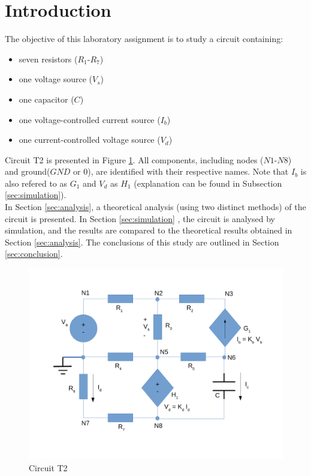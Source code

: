 
\section{Introduction}
\label{sec:introduction}


The objective of this laboratory assignment is to study a circuit containing:
\begin{itemize}
	\item seven resistors ($R_1$-$R_7$)
	\item one voltage source ($V_s$) %
	\item one capacitor ($C$)
	\item one voltage-controlled current source ($I_b$)
	\item one current-controlled voltage source ($V_d$)
\end{itemize}


Circuit T2 is presented in Figure \ref{fig:Desenho_t2}. All components, including nodes
($N1$-$N8$) and ground($GND$ or $0$), are identified with their respective names. Note
that $I_b$ is also refered to as $G_1$ and $V_d$ as $H_1$ (explanation can be found in 
Subsection \ref{sec:simulation}). \\

In Section \ref{sec:analysis}, a theoretical analysis (using two distinct methods) of
the circuit is presented. In Section \ref{sec:simulation} , the circuit is analysed by
simulation, and the results are compared to the theoretical results obtained in Section
\ref{sec:analysis}. The conclusions of this study are outlined in Section \ref{sec:conclusion}.


\begin{figure}[ht]
	\centering
	\includegraphics[width=0.85\linewidth]{dsnh_t2.pdf}
	\caption{Circuit T2}
\label{fig:Desenho_t2}
\end{figure}

